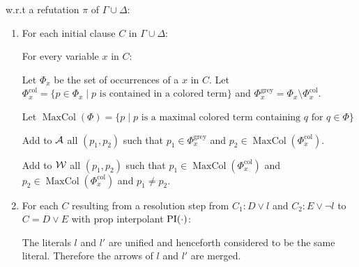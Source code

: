 \documentclass[,%
	paper=a4,%
	DIV12, %
	twoside=false,%
	liststotoc,
	bibtotoc,
	draft=false,%
	numbers=noendperiod
]{scrartcl}
\begin{document}
w.r.t a refutation $\pi$ of $\Gamma \cup \Delta$:

\newcommand{\Phicol}{\Phi^{\operatorname{col}}}
\newcommand{\Phigrey}{\Phi^{\operatorname{grey}}}
\newcommand{\MaxCol}{\operatorname{MaxCol}}
\begin{enumerate}
	\item For each initial clause $C$ in $\Gamma \cup \Delta$:

		For every variable $x$ in $C$:

		Let $\Phi_x$ be the set of occurrences of a $x$ in $C$. 
		Let $\Phicol_x = \{p \in \Phi_x \mid \text{$p$ is contained in a colored term} \}$
		and $\Phigrey_x = \Phi_x \setminus \Phicol_x$.

		Let $\MaxCol(\Phi) = \{p \mid \text{$p$ is a maximal colored term containing $q$ for $q \in \Phi$} \}$

		Add to $\operatorname{\mathcal{A}}$ all $(p_1, p_2)$ such that $p_1\in\Phigrey_x$ and $p_2 \in \MaxCol(\Phicol_x)$.
		
		Add to $\operatorname{\mathcal{W}}$ all $(p_1, p_2)$ such that $p_1\in\MaxCol(\Phicol_x)$ and $p_2\in\MaxCol(\Phicol_x)$ and $p_1 \neq p_2$.




	\item 
		For each $C$ resulting from a resolution step from $C_1: D\lor l$ and $C_2: E\lor \lnot l$ to $C = D \lor E$ with prop interpolant $\operatorname{PI}(\cdot)$:

		The literals $l$ and $l'$ are unified and henceforth considered to be the same literal.
		Therefore the arrows of $l$ and $l'$ are merged.




\end{enumerate}
\end{document}
